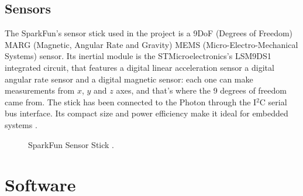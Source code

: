 \subsection{Sensors}
The SparkFun's sensor stick used in the project is a 9DoF (Degrees of Freedom) MARG (Magnetic, Angular Rate and Gravity) MEMS (Micro-Electro-Mechanical Systems) sensor. Its inertial module is the STMicroelectronics's LSM9DS1 integrated circuit, that features a digital linear acceleration sensor a digital angular rate sensor and a digital magnetic sensor: each one can make measurements from $x$, $y$ and $z$ axes, and that's where the 9 degrees of freedom came from. The stick has been connected to the Photon through the I$^2$C serial bus interface. Its compact size and power efficiency make it ideal for embedded systems \cite{SensorDatasheet}.
\begin{center}
	\begin{figure}[ht!]
		\caption{SparkFun Sensor Stick \cite{IMU}.}
	\end{figure}
\end{center}

\section{Software}

